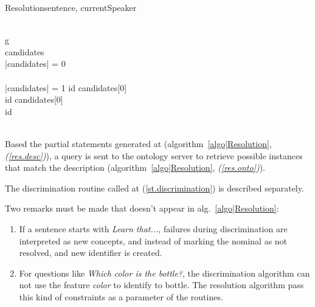 \documentclass[twoside,a4paper,10pt]{report}
\begin{document}
\begin{pseudocode}[ruled]{Resolution}{sentence, currentSpeaker}
\label{algo|Resolution}

 \GETS {} \\

\FOREACH g \in {} \DO 
\BEGIN
    \GETS {} \\
   candidates \GETS {} \\
   
   \IF \left|{candidates}\right| = 0 \THEN
    \BEGIN
       \\
      \EXIT \\
    \END
   \ELSEIF \left|{candidates}\right| = 1 \THEN
      id \GETS candidates[0] \\

   \ELSE
      \BEGIN
	\IF {} \THEN
	  id \GETS candidates[0] \\
	\ELSE
	  id \GETS {} \\
      \END \\
\END
\end{pseudocode}

Based the partial statements generated at (algorithm~\ref{algo|Resolution},
\emph{(\ref{res.desc})}), a query is sent to the ontology server to retrieve
possible instances that match the description (algorithm~\ref{algo|Resolution},
\emph{(\ref{res.onto})}).

The discrimination routine called at (\ref{st.discrimination}) is described separately.

Two remarks must be made that doesn't appear in alg.~\ref{algo|Resolution}:
\begin{enumerate}
    \item If a sentence starts with {\it Learn that...}, failures during 
    discrimination are interpreted as new concepts, and instead of marking the 
    nominal as not resolved, and new identifier is created.
    \item For questions like {\it Which color is the bottle?}, the discrimination 
    algorithm can not use the feature {\it color} to identify to bottle. The 
    resolution algorithm pass this kind of constraints as a parameter of the 
     routines.
\end{enumerate}
\end{document}
